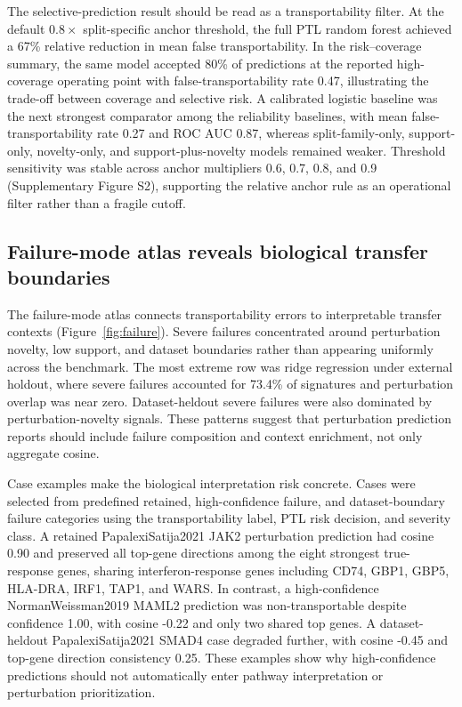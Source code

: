 The selective-prediction result should be read as a transportability filter. At the default \(0.8\times\) split-specific anchor threshold, the full PTL random forest achieved a 67\% relative reduction in mean false transportability. In the risk--coverage summary, the same model accepted 80\% of predictions at the reported high-coverage operating point with false-transportability rate 0.47, illustrating the trade-off between coverage and selective risk. A calibrated logistic baseline was the next strongest comparator among the reliability baselines, with mean false-transportability rate 0.27 and ROC AUC 0.87, whereas split-family-only, support-only, novelty-only, and support-plus-novelty models remained weaker. Threshold sensitivity was stable across anchor multipliers 0.6, 0.7, 0.8, and 0.9 (Supplementary Figure S2), supporting the relative anchor rule as an operational filter rather than a fragile cutoff.

\subsection{Failure-mode atlas reveals biological transfer boundaries}

The failure-mode atlas connects transportability errors to interpretable transfer contexts (Figure~\ref{fig:failure}). Severe failures concentrated around perturbation novelty, low support, and dataset boundaries rather than appearing uniformly across the benchmark. The most extreme row was ridge regression under external holdout, where severe failures accounted for 73.4\% of signatures and perturbation overlap was near zero. Dataset-heldout severe failures were also dominated by perturbation-novelty signals. These patterns suggest that perturbation prediction reports should include failure composition and context enrichment, not only aggregate cosine.

Case examples make the biological interpretation risk concrete. Cases were selected from predefined retained, high-confidence failure, and dataset-boundary failure categories using the transportability label, PTL risk decision, and severity class. A retained PapalexiSatija2021 JAK2 perturbation prediction had cosine 0.90 and preserved all top-gene directions among the eight strongest true-response genes, sharing interferon-response genes including CD74, GBP1, GBP5, HLA-DRA, IRF1, TAP1, and WARS. In contrast, a high-confidence NormanWeissman2019 MAML2 prediction was non-transportable despite confidence 1.00, with cosine -0.22 and only two shared top genes. A dataset-heldout PapalexiSatija2021 SMAD4 case degraded further, with cosine -0.45 and top-gene direction consistency 0.25. These examples show why high-confidence predictions should not automatically enter pathway interpretation or perturbation prioritization.


